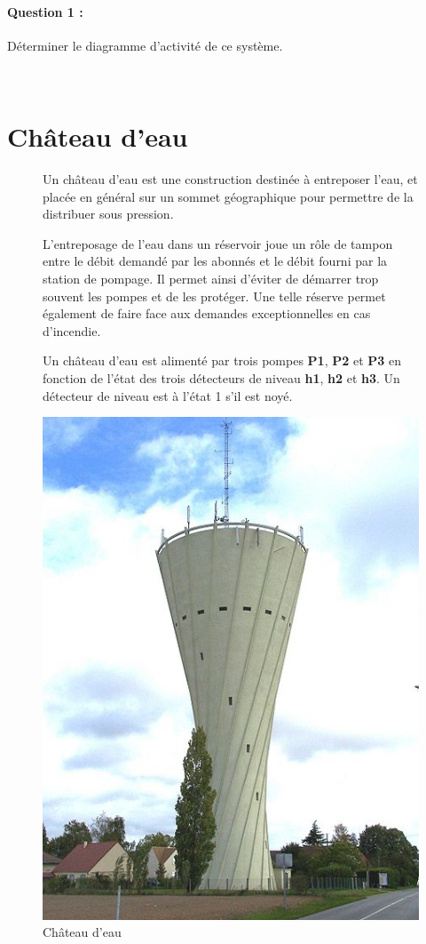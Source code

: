 \paragraph{Question 1 :} Déterminer le diagramme d'activité de ce système.

\newpage

~\

\newpage

\section{Château d'eau}

\begin{figure}[!h]
\begin{minipage}{0.55\linewidth}
Un château d'eau est une construction destinée à entreposer l'eau, et placée en général sur un sommet géographique pour permettre de la distribuer sous pression.

L'entreposage de l'eau dans un réservoir joue un rôle de tampon entre le débit demandé par les abonnés et le débit fourni par la station de pompage. Il permet ainsi d'éviter de démarrer trop souvent les pompes et de les protéger. Une telle réserve permet également de faire face aux demandes exceptionnelles en cas d'incendie.

Un château d'eau est alimenté par trois pompes \textbf{P1}, \textbf{P2} et \textbf{P3} en fonction de l'état des trois détecteurs de niveau \textbf{h1}, \textbf{h2} et \textbf{h3}. Un détecteur de niveau est à l'état 1 s'il est noyé.
\end{minipage}
\hfill
\begin{minipage}{0.4\linewidth}
 \begin{center}
 \includegraphics[width=0.7\linewidth]{img/chateau-eau.jpg}
 \end{center}
 \caption{Château d'eau}
 \label{img3}
 \end{minipage}
\end{figure}

